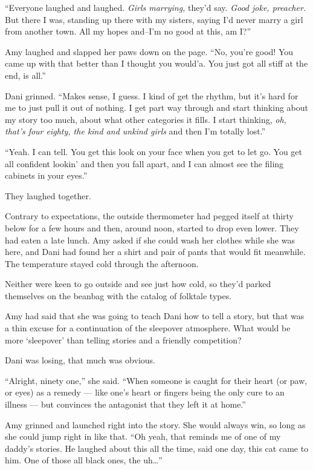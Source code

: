 ``Everyone laughed and laughed. \emph{Girls marrying,} they'd say. \emph{Good joke, preacher.} But there I was, standing up there with my sisters, saying I'd never marry a girl from another town. All my hopes and--I'm no good at this, am I?''

Amy laughed and slapped her paws down on the page. ``No, you're good! You came up with that better than I thought you would'a. You just got all stiff at the end, is all.''

Dani grinned. ``Makes sense, I guess. I kind of get the rhythm, but it's hard for me to just pull it out of nothing. I get part way through and start thinking about my story too much, about what other categories it fills. I start thinking, \emph{oh, that's four eighty, the kind and unkind girls} and then I'm totally lost.''

``Yeah. I can tell. You get this look on your face when you get to let go. You get all confident lookin' and then you fall apart, and I can almost see the filing cabinets in your eyes.''

They laughed together.

Contrary to expectations, the outside thermometer had pegged itself at thirty below for a few hours and then, around noon, started to drop even lower. They had eaten a late lunch. Amy asked if she could wash her clothes while she was here, and Dani had found her a shirt and pair of pants that would fit meanwhile. The temperature stayed cold through the afternoon.

Neither were keen to go outside and see just how cold, so they'd parked themselves on the beanbag with the catalog of folktale types.

Amy had said that she was going to teach Dani how to tell a story, but that was a thin excuse for a continuation of the sleepover atmosphere. What would be more `sleepover' than telling stories and a friendly competition?

Dani was losing, that much was obvious.

``Alright, ninety one,'' she said. ``When someone is caught for their heart (or paw, or eyes) as a remedy --- like one's heart or fingers being the only cure to an illness --- but convinces the antagonist that they left it at home.''

Amy grinned and launched right into the story. She would always win, so long as she could jump right in like that. ``Oh yeah, that reminds me of one of my daddy's stories. He laughed about this all the time, said one day, this cat came to him. One of those all black ones, the uh\ldots{}''

